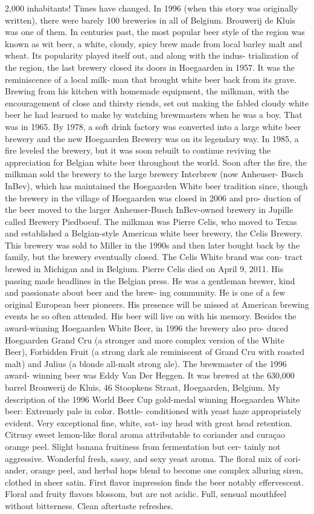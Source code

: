 \documentclass[a4paper,parskip=half]{scrartcl}
\begin{document}
2,000 inhabitants! Times have changed.
In 1996 (when this story was originally
written), there were barely 100 breweries
in all of Belgium. Brouwerij de Kluis was
one of them.
In centuries past, the most popular beer
style of the region was known as wit beer,
a white, cloudy, spicy brew made from
local barley malt and wheat. Its popularity
played itself out, and along with the indus-
trialization of the region, the last brewery
closed its doors in Hoegaarden in 1957.
It was the reminiscence of a local milk-
man that brought white beer back from
its grave. Brewing from his kitchen with
homemade equipment, the milkman, with
the encouragement of close and thirsty
riends, set out making the fabled cloudy
white beer he had learned to make by
watching brewmasters when he was a boy.
That was in 1965. By 1978, a soft drink
factory was converted into a large white
beer brewery and the new Hoegaarden
Brewery was on its legendary way.
In 1985, a fire leveled the brewery, but
it was soon rebuilt to continue reviving
the appreciation for Belgian white beer
throughout the world. Soon after the
fire, the milkman sold the brewery to the
large brewery Interbrew (now Anheuser-
Busch InBev), which has maintained the
Hoegaarden White beer tradition since,
though the brewery in the village of
Hoegaarden was closed in 2006 and pro-
duction of the beer moved to the larger
Anheuser-Busch InBev-owned brewery in
Jupille called Brewery Piedboeuf.
The milkman was Pierre Celis, who moved
to Texas and established a Belgian-style
American white beer brewery, the Celis
Brewery. This brewery was sold to Miller
in the 1990s and then later bought back
by the family, but the brewery eventually
closed. The Celis White brand was con-
tract brewed in Michigan and in Belgium.
Pierre Celis died on April 9, 2011. His
passing made headlines in the Belgian
press. He was a gentleman brewer, kind
and passionate about beer and the brew-
ing community. He is one of a few original
European beer pioneers. His presence will
be missed at American brewing events he
so often attended. His beer will live on
with his memory.
Besides the award-winning Hoegaarden
White Beer, in 1996 the brewery also pro-
duced Hoegaarden Grand Cru (a stronger
and more complex version of the White
Beer), Forbidden Fruit (a strong dark ale
reminiscent of Grand Cru with roasted
malt) and Julius (a blonde all-malt strong
ale). The brewmaster of the 1996 award-
winning beer was Eddy Van Der Heggen.
It was brewed at the 630,000 barrel
Brouwerij de Kluis, 46 Stoopkens Straat,
Hoegaarden, Belgium.
My description of the 1996 World Beer
Cup gold-medal winning Hoegaarden
White beer: Extremely pale in color. Bottle-
conditioned with yeast haze appropriately
evident. Very exceptional fine, white, sat-
iny head with great head retention. Citrusy
sweet lemon-like floral aroma attributable
to coriander and curaçao orange peel. Slight
banana fruitiness from fermentation but cer-
tainly not aggressive. Wonderful fresh, sassy,
and sexy yeast aroma. The floral mix of cori-
ander, orange peel, and herbal hops blend to
become one complex alluring siren, clothed in
sheer satin. First flavor impression finds the
beer notably effervescent. Floral and fruity
flavors blossom, but are not acidic. Full,
sensual mouthfeel without bitterness. Clean
aftertaste refreshes.
\end{document}
